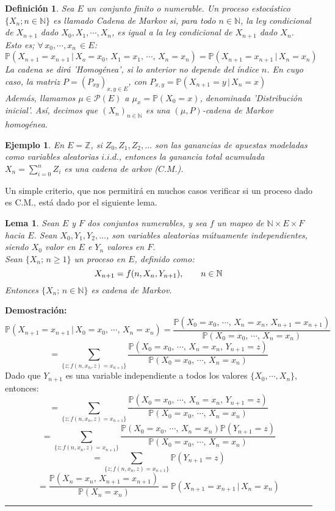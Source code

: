 \documentclass[a4paper]{article}
\newcommand{\prob}{\mathbb{P}}
\newtheorem{definicion}{Definición}
\newtheorem{ejemplo}{Ejemplo}
\newtheorem{lem}{Lema}
\numberwithin{equation}{subsection}
\numberwithin{definicion}{subsection}
\def\N{\mathbb N}
\def\Z{\mathbb Z}
\begin{document}
\begin{definicion}
Sea $E$ un conjunto finito o numerable. Un proceso estocástico $\{X_n;n\in \N\}$ es llamado \textit{Cadena de Markov} si, para todo $n\in\N$, la ley condicional de $X_{n+1}$ dado $X_0,X_1,\cdots,X_n$, es igual a la ley condicional de $X_{n+1}$ dado $X_n$.\\ \newline Esto es; $\forall\,x_0,\cdots,x_n\,\in E$:
\[\prob\left(X_{n+1}=x_{n+1}\,|\,X_o = x_0,\,X_1=x_1,\,\cdots,\,X_n=x_n\right) = \prob\left(X_{n+1}=x_{n+1}\,|\,X_n=x_n\right)\]
La cadena se dirá 'Homogénea', si lo anterior no depende del índice $n$. En cuyo caso, la matriz $P=\left(P_{xy}\right)_{x,y\in E}$, con $P_{x,y} = \prob\left(X_{n+1}=y\,|\,X_n = x\right)$\\ \newline
Además, llamamos $\mu\in \mathcal{P}(E)$ a $\mu_x = \prob(X_0 = x)$, denominada 'Distribución inicial'. Así, decimos que $\left(X_n\right)_{n\in\N}$ es una $(\mu,P)$-cadena de Markov homogénea.
\end{definicion}

\begin{ejemplo}
En $E=\Z$, si $Z_0,Z_1,Z_2,...$ son las ganancias de apuestas modeladas como variables aleatorias $i.i.d.$, entonces la ganancia total acumulada $X_n = \sum_{i=0}^nZ_i$ es una cadena de arkov ($C.M.$).
\end{ejemplo}

Un simple criterio, que nos permitirá en muchos casos verificar si un proceso dado es C.M., está dado por el siguiente lema.

\begin{lem}
Sean $E$ y $F$ dos conjuntos numerables, y sea $f$ un mapeo de $\N\times E \times F$ hacia $E$. Sean $X_0,Y_1,Y_2,...$, son variables aleatorias mútuamente independientes, siendo $X_0$ valor en $E$ e $Y_n$ valores en $F$.\\ 
Sean $\{X_n;\,n\geq 1\}$ un proceso en $E$, definido como:
\[X_{n+1} = f(n,X_n,Y_{n+1}),\hspace{0.7cm}n\in\N\]
Entonces $\{X_n;\,n\in\N\}$ es cadena de Markov.
\end{lem}

\textbf{Demostración: }
\[\prob\left(X_{n+1} = x_{n+1}\,|\,X_0=x_0,\,\cdots,\,X_n=x_n\right) = \frac{\prob\left(X_0=x_0,\,\cdots,\,X_n=x_n,\,X_{n+1}=x_{n+1}\right)}{\prob\left(X_0=x_0,\,\cdots,\,X_n=x_n\right)}\]
\[ = \sum_{\{z;f(n,x_n,z)=x_{n+1}\}}\frac{\prob\left(X_0=x_0,\,\cdots,\,X_n=x_n,\,Y_{n+1}=z\right)}{\prob\left(X_0=x_0,\,\cdots,\,X_n=x_n\right)}\]
Dado que $Y_{n+1}$ es una variable independiente a todos los valores $\{X_0,\cdots,X_n\}$, entonces:
\[ = \sum_{\{z;f(n,x_n,z)=x_{n+1}\}}\frac{\prob\left(X_0=x_0,\,\cdots,\,X_n=x_n,\,Y_{n+1}=z\right)}{\prob\left(X_0=x_0,\,\cdots,\,X_n=x_n\right)}\]
\[ = \sum_{\{z;f(n,x_n,z)=x_{n+1}\}}\frac{\prob\left(X_0=x_0,\,\cdots,\,X_n=x_n\right)\prob\left(Y_{n+1}=z\right)}{\prob\left(X_0=x_0,\,\cdots,\,X_n=x_n\right)}\]
\[ = \sum_{\{z;f(n,x_n,z)=x_{n+1}\}}\prob\left(Y_{n+1}=z\right)\]
\[=\frac{\prob\left(X_n = x_n,\,X_{n+1}=x_{n+1}\right)}{\prob\left(X_n =x_n\right)} = \prob\left(X_{n+1}=x_{n+1}\,|\,X_n=x_n\right)\]
\rule{0.7em}{0.7em}
\end{document}
